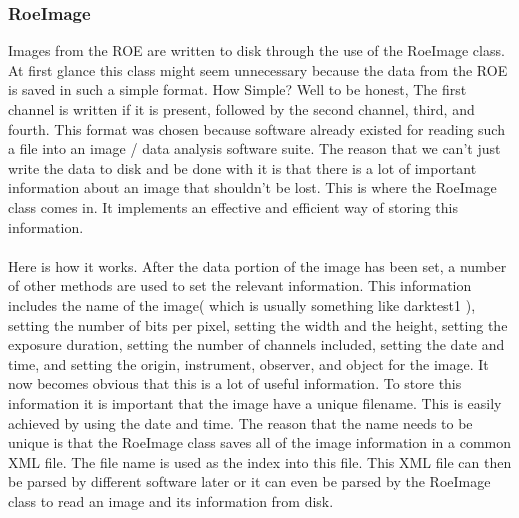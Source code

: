 \subsubsection{RoeImage}
Images from the ROE are written to disk through the use of the RoeImage class. At first glance this class might seem
unnecessary because the data from the ROE is saved in such a simple format. How Simple? Well to be honest, The first
channel is written if it is present, followed by the second channel, third, and fourth. This format was chosen because
software already existed for reading such a file into an image / data analysis software suite. The reason that we 
can't just write the data to disk and be done with it is that there is a lot of important information about an
image that shouldn't be lost. This is where the RoeImage class comes in. It implements an effective and efficient
way of storing this information.\\
\\
Here is how it works. After the data portion of the image has been set, a number of other methods are used to set
the relevant information. This information includes the name of the image( which is usually something like darktest1 ),
setting the number of bits per pixel, setting the width and the height, setting the exposure duration, setting the 
number of channels included, setting the date and time, and setting the origin, instrument, observer, and object for the
image. It now becomes obvious that this is a lot of useful information. To store this information it is important that the
image have a unique filename. This is easily achieved by using the date and time. The reason that the name needs to be 
unique is that the RoeImage class saves all of the image information in a common XML file. The file name is used as the
index into this file. This XML file can then be parsed by different software later or it can even be parsed by
the RoeImage class to read an image and its information from disk.

%

